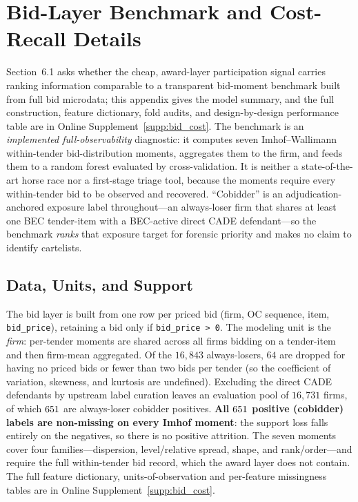 %
\section{Bid-Layer Benchmark and Cost-Recall Details}
\label{app:bid_benchmark_submission}

Section~6.1 asks whether the cheap, award-layer participation signal
carries ranking information comparable to a transparent bid-moment
benchmark built from full bid microdata; this appendix gives the model
summary, and the full construction, feature dictionary, fold audits, and
design-by-design performance table are in Online Supplement~\ref{supp:bid_cost}. The
benchmark is an \emph{implemented
full-observability} diagnostic: it computes seven Imhof--Wallimann
within-tender bid-distribution moments, aggregates them to the firm, and
feeds them to a random forest evaluated by cross-validation. It is neither
a state-of-the-art horse race nor a first-stage triage tool, because the
moments require every within-tender bid to be observed and recovered.
``Cobidder'' is an adjudication-anchored exposure label throughout---an
always-loser firm that shares at least one BEC tender-item with a
BEC-active direct CADE defendant---so the benchmark \emph{ranks} that
exposure target for forensic priority and makes no claim to identify
cartelists.

\subsection{Data, Units, and Support}
\label{app:bid_data_submission}

The bid layer is built from one row per priced bid (firm, OC sequence,
item, \texttt{bid\_price}), retaining a bid only if
\texttt{bid\_price > 0}. The modeling unit is the \emph{firm}: per-tender
moments are shared across all firms bidding on a tender-item and then
firm-mean aggregated. Of the $16{,}843$ always-losers, $64$ are dropped
for having no priced bids or fewer than two bids per tender (so the
coefficient of variation, skewness, and kurtosis are undefined). Excluding
the direct CADE defendants by upstream label curation leaves an evaluation
pool of $16{,}731$ firms, of which $651$ are always-loser
cobidder positives. \textbf{All $651$ positive (cobidder)
labels are non-missing on every Imhof moment}: the support loss falls
entirely on the negatives, so there is no positive attrition. The seven
moments cover four families---dispersion, level/relative spread, shape, and
rank/order---and require the full within-tender bid record, which the award
layer does not contain. The full feature dictionary, units-of-observation
and per-feature missingness tables are in Online Supplement~\ref{supp:bid_cost}.


